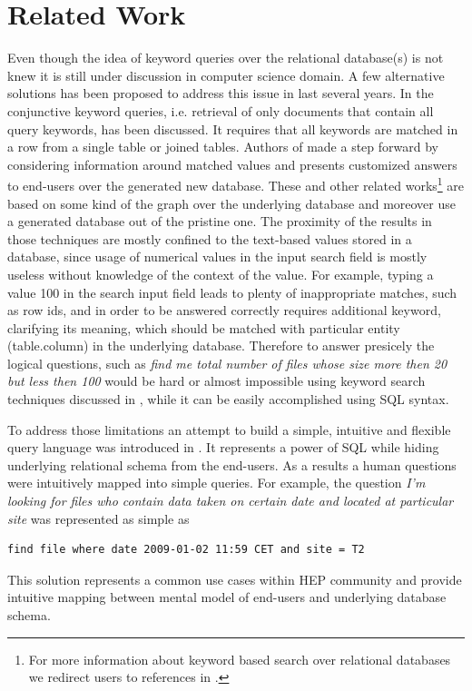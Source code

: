\documentclass[a4paper]{jpconf}
\begin{document}
\section{Related Work\label{RelatedWork}}
Even though the idea of keyword queries over the relational database(s)
is not knew it is still under discussion in computer science domain.
A few alternative solutions has been proposed to address this issue
in last several years. In \cite{DBXplorer} the conjunctive keyword queries,
i.e. retrieval of only documents that contain all query keywords, has
been discussed. It requires that all keywords are matched in a row from a
single table or joined tables. Authors of \cite{QueryAnswer} made a step forward
by considering information around matched values and presents customized answers to
end-users over the generated new database. These and other related 
works\footnote{For more information about keyword based search over relational 
databases we redirect users to references in \cite{DBXplorer, QueryAnswer}.} 
are based on some kind of the graph over the underlying database and
moreover use a generated database out of the pristine one.
The proximity of the results in those techniques 
are mostly confined to the text-based values stored in a database, since 
usage of numerical values in the input search field is mostly useless without 
knowledge of the context of the value. For example, typing a value 100 
in the search input field leads to plenty of inappropriate matches, 
such as row ids, and in order to be
answered correctly requires additional keyword, clarifying its meaning, 
which should be matched with particular
entity (table.column) in the underlying database.
Therefore to answer presicely the logical questions, such as  
{\it find me total number of files whose size more then 20 but less then 
100} would be hard or almost impossible using keyword search techniques discussed 
in \cite{DBXplorer, QueryAnswer}, while it can be easily accomplished
using SQL syntax. 

To address those limitations an attempt to build a simple, intuitive and 
flexible query language was introduced in \cite{DBS-QL}.
It represents a power of SQL while hiding underlying relational schema from 
the end-users. As a results a human questions were intuitively mapped into 
simple queries. For example, the question
{\it I'm looking for files who contain data taken on certain date and located at
particular site} was represented as simple as \cite{DBS-QL}
\begin{verbatim}
find file where date 2009-01-02 11:59 CET and site = T2
\end{verbatim}
This solution represents a common use cases within HEP community and provide
intuitive mapping between mental model of end-users and underlying database schema.
\end{document}
